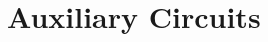 \documentclass[../../main]{subfiles}
\begin{document}
\section{Auxiliary Circuits} \label{sec:}
\end{document}
